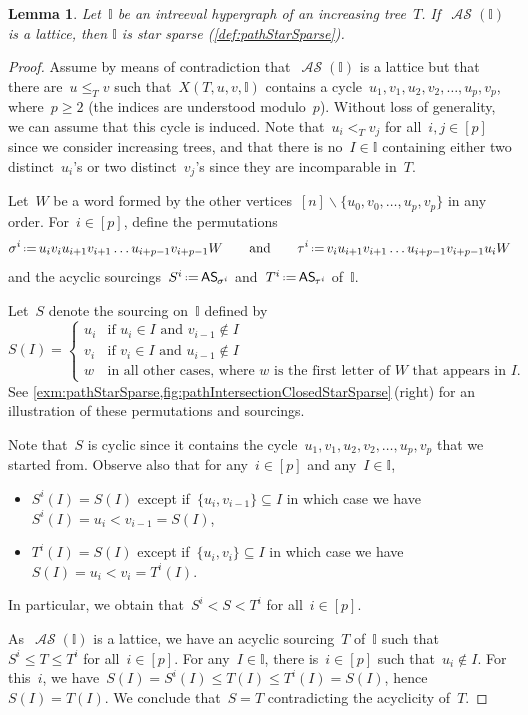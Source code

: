\documentclass{amsart}
\newtheorem{lemma}[theorem]{Lemma}
\theoremstyle{definition}
\newcommand{\ssm}{\smallsetminus} %
\newcommand{\eqdef}{\mbox{\,\raisebox{0.2ex}{\scriptsize\ensuremath{\mathrm:}}\ensuremath{=}\,}} %
\newcommand{\mymap}[2]{\mathsf{#1}_{\hspace{-.7pt}#2}}
\DeclareMathOperator{\ASour}{\mathcal{AS}}  %
\newcommand{\asour}[1]{\mymap{AS}{#1}}  %
\newcommand{\II}{\mathbb I} %
\begin{document}
\begin{lemma}
\label{lem:pathStarSparse}
Let~$\II$ be an intreeval hypergraph of an increasing tree~$T$.
If~$\ASour(\II)$ is a lattice, then $\II$ is star sparse (\cref{def:pathStarSparse}).
\end{lemma}

\begin{proof}
Assume by means of contradiction that~$\ASour(\II)$ is a lattice but that there are~$u \le_T v$ such that~$X(T,u,v,\II)$ contains a cycle~$u_1, v_1, u_2, v_2, \dots, u_p, v_p$, where~$p \ge 2$ (the indices are understood modulo~$p$).
Without loss of generality, we can assume that this cycle is induced.
Note that~$u_i <_T v_j$ for all~$i,j \in [p]$ since we consider increasing trees, and that there is no~$I \in \II$ containing either two distinct~$u_i$'s or two distinct~$v_j$'s since they are incomparable in~$T$.

Let~$W$ be a word formed by the other vertices~$[n] \ssm \{u_0, v_0, \dots, u_p, v_p\}$ in any order.
For~$i \in [p]$, define the permutations
\[
\sigma^i \eqdef u_i v_i u_{i+1} v_{i+1} \dots u_{i+p-1} v_{i+p-1} W
\qquad\text{and}\qquad
\tau^i \eqdef v_i u_{i+1} v_{i+1} \dots u_{i+p-1} v_{i+p-1} u_i W
\]
and the acyclic sourcings~$S^i \eqdef \asour{\sigma^i}$ and~$T^i \eqdef \asour{\tau^i}$ of~$\II$.

Let~$S$ denote the sourcing on~$\II$ defined by
\[
S(I) = 
\begin{cases}
	u_i & \text{if~$u_i \in I$ and~$v_{i-1} \notin I$} \\
	v_i & \text{if~$v_i \in I$ and~$u_{i-1} \notin I$} \\
	w & \text{in all other cases, where~$w$ is the first letter of~$W$ that appears in~$I$}.
\end{cases}
\]
See \cref{exm:pathStarSparse,fig:pathIntersectionClosedStarSparse}\,(right) for an illustration of these permutations and sourcings.

Note that~$S$ is cyclic since it contains the cycle~$u_1, v_1, u_2, v_2, \dots, u_p, v_p$ that we started from.
Observe also that for any~$i \in [p]$ and any~$I \in \II$,
\begin{itemize}
\item $S^i(I) = S(I)$ except if~$\{u_i, v_{i-1}\} \subseteq I$ in which case we have~$S^i(I) = u_i < v_{i-1} = S(I)$,
\item $T^i(I) = S(I)$ except if~$\{u_i, v_i\} \subseteq I$ in which case we have~$S(I) = u_i < v_i = T^i(I)$.
\end{itemize}
In particular, we obtain that~$S^i < S < T^i$ for all~$i \in [p]$.

As~$\ASour(\II)$ is a lattice, we have an acyclic sourcing~$T$ of~$\II$ such that~$S^i \le T \le T^i$ for all~$i \in [p]$.
For any~$I \in \II$, there is~$i \in [p]$ such that~$u_i \notin I$.
For this~$i$, we have~$S(I) = S^i(I) \le T(I) \le T^i(I) = S(I)$, hence~$S(I) = T(I)$.
We conclude that~$S = T$ contradicting the acyclicity of~$T$.
\end{proof}
\end{document}
